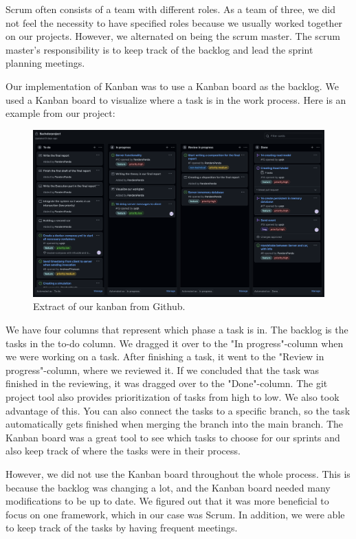 Scrum often consists of a team with different roles. As a team of three, we did not feel the necessity to have specified roles because we usually worked together on our projects. However, we alternated on being the scrum master. The scrum master's responsibility is to keep track of the backlog and lead the sprint planning meetings.

Our implementation of Kanban was to use a Kanban board as the backlog. We used a Kanban board to visualize where a task is in the work process. Here is an example from our project:

\begin{figure}[h!]
	\centering
	\includegraphics[width=1\linewidth]{figures/kanban_screenshot}
	\caption[kanban screenshot]{Extract of our kanban from Github.}
	\label{fig:kanbanscreenshot}
\end{figure}

We have four columns that represent which phase a task is in. The backlog is the tasks in the to-do column. We dragged it over to the "In progress"-column when we were working on a task. After finishing a task, it went to the "Review in progress"-column, where we reviewed it. If we concluded that the task was finished in the reviewing, it was dragged over to the "Done"-column. The git project tool also provides prioritization of tasks from high to low. We also took advantage of this. You can also connect the tasks to a specific branch, so the task automatically gets finished when merging the branch into the main branch. The Kanban board was a great tool to see which tasks to choose for our sprints and also keep track of where the tasks were in their process.

However, we did not use the Kanban board throughout the whole process. This is because the backlog was changing a lot, and the Kanban board needed many modifications to be up to date. We figured out that it was more beneficial to focus on one framework, which in our case was Scrum. In addition, we were able to keep track of the tasks by having frequent meetings. 